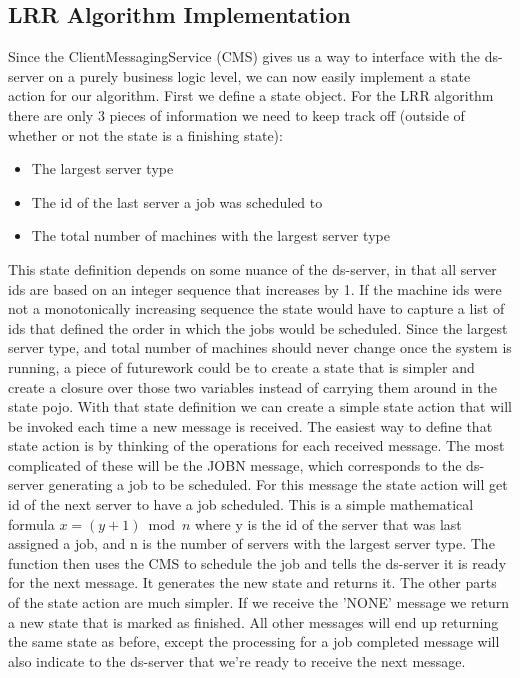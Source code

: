 \documentclass[a4paper]{article} %
\begin{document}
\subsection*{LRR Algorithm Implementation}
Since the ClientMessagingService (CMS) gives us a way to interface with the ds-server on a purely business logic level, we can now easily implement a state action for our algorithm.
First we define a state object. For the LRR algorithm there are only 3 pieces of information we need to keep track off (outside of whether or not the state is a finishing state):
\begin{itemize}
    \item The largest server type
    \item The id of the last server a job was scheduled to
    \item The total number of machines with the largest server type
\end{itemize}
This state definition depends on some nuance of the ds-server, in that all server ids are based on an integer sequence that increases by 1. 
If the machine ids were not a monotonically increasing sequence the state would have to capture a list of ids that defined the order in which the jobs would be scheduled.
Since the largest server type, and total number of machines should never change once the system is running, a piece of futurework could be to create a state that is simpler and create a closure over those two variables instead of carrying them around in the state pojo.
\newline
With that state definition we can create a simple state action that will be invoked each time a new message is received. 
The easiest way to define that state action is by thinking of the operations for each received message. The most complicated of these will be the JOBN message, which corresponds to the ds-server generating a job to be scheduled.
For this message the state action will get id of the next server to have a job scheduled. This is a simple mathematical formula 
\begin{math}
    x = (y + 1) \bmod n
\end{math}
where y is the id of the server that was last assigned a job, and n is the number of servers with the largest server type.
The function then uses the CMS to schedule the job and tells the ds-server it is ready for the next message.
It generates the new state and returns it.
\newline
The other parts of the state action are much simpler. If we receive the 'NONE' message we return a new state that is marked as finished.
All other messages will end up returning the same state as before, except the processing for a job completed message will also indicate to the ds-server that we're ready to receive the next message.
\end{document}
